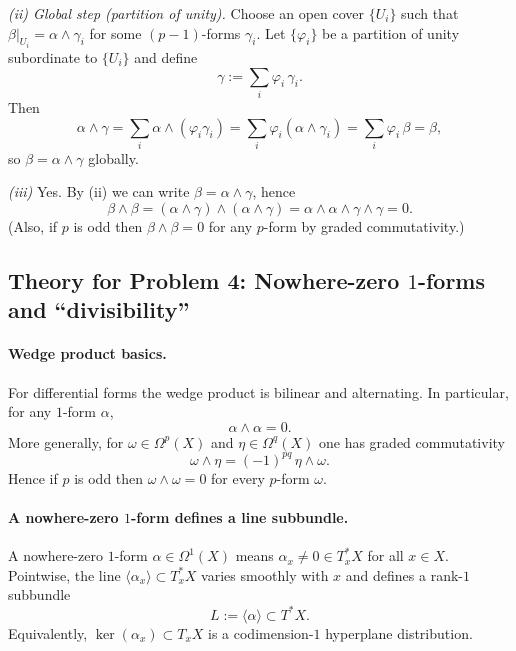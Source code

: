 \documentclass[12pt,a4paper]{article}
\theoremstyle{plain}
\theoremstyle{definition}      %
\begin{document}
	\smallskip
	\textit{(ii) Global step (partition of unity).}
	Choose an open cover $\{U_i\}$ such that $\beta|_{U_i}=\alpha\wedge\gamma_i$ for some $(p-1)$-forms $\gamma_i$.
	Let $\{\varphi_i\}$ be a partition of unity subordinate to $\{U_i\}$ and define
	\[
	\gamma := \sum_i \varphi_i\,\gamma_i.
	\]
	Then
	\[
	\alpha\wedge\gamma
	= \sum_i \alpha\wedge(\varphi_i\gamma_i)
	= \sum_i \varphi_i(\alpha\wedge\gamma_i)
	= \sum_i \varphi_i\,\beta
	= \beta,
	\]
	so $\beta=\alpha\wedge\gamma$ globally.
	
	\smallskip
	\textit{(iii)} Yes. By (ii) we can write $\beta=\alpha\wedge\gamma$, hence
	\[
	\beta\wedge\beta = (\alpha\wedge\gamma)\wedge(\alpha\wedge\gamma)
	= \alpha\wedge\alpha\wedge\gamma\wedge\gamma=0.
	\]
	(Also, if $p$ is odd then $\beta\wedge\beta=0$ for any $p$-form by graded commutativity.)
	
	
	
	
	
	
	\subsection*{Theory for Problem 4: Nowhere-zero $1$-forms and ``divisibility''}
	
	\paragraph{Wedge product basics.}
	For differential forms the wedge product is bilinear and alternating. In particular, for any $1$-form $\alpha$,
	\[
	\alpha\wedge\alpha=0.
	\]
	More generally, for $\omega\in\Omega^p(X)$ and $\eta\in\Omega^q(X)$ one has graded commutativity
	\[
	\omega\wedge\eta = (-1)^{pq}\,\eta\wedge\omega.
	\]
	Hence if $p$ is odd then $\omega\wedge\omega=0$ for every $p$-form $\omega$.
	
	\paragraph{A nowhere-zero $1$-form defines a line subbundle.}
	A nowhere-zero $1$-form $\alpha\in\Omega^1(X)$ means $\alpha_x\neq 0\in T_x^*X$ for all $x\in X$.
	Pointwise, the line $\langle \alpha_x\rangle\subset T_x^*X$ varies smoothly with $x$ and defines a rank-$1$ subbundle
	\[
	L:=\langle \alpha\rangle \subset T^*X.
	\]
	Equivalently, $\ker(\alpha_x)\subset T_xX$ is a codimension-$1$ hyperplane distribution.
	
\end{document}
